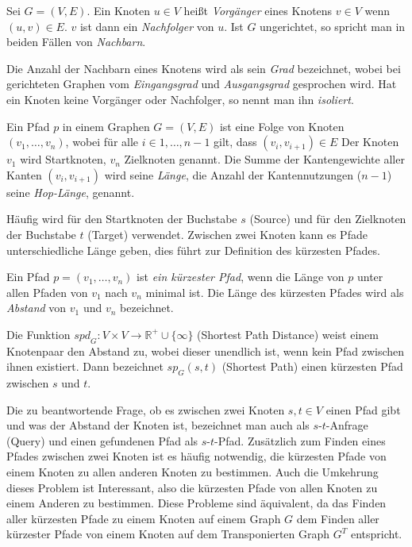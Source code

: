 \begin{definition}[Nachbar]
  Sei $G = (V, E)$. Ein Knoten $u \in V$ heißt \emph{Vorgänger} eines Knotens $v \in V$ wenn $(u, v) \in E$. $v$ ist dann ein \emph{Nachfolger} von $u$.
  Ist $G$ ungerichtet, so spricht man in beiden Fällen von \emph{Nachbarn}.
\end{definition}

Die Anzahl der Nachbarn eines Knotens wird als sein \emph{Grad} bezeichnet, wobei bei gerichteten Graphen vom \emph{Eingangsgrad} und \emph{Ausgangsgrad} gesprochen wird.
Hat ein Knoten keine Vorgänger oder Nachfolger, so nennt man ihn \emph{isoliert}.

\begin{definition}[Pfad]
  Ein Pfad $p$ in einem Graphen $G = (V, E)$ ist eine Folge von Knoten $(v_1, \dotsc, v_n)$, wobei für alle $i \in {1, \dotsc, n-1}$ gilt, dass $(v_i, v_{i+1}) \in E$
  Der Knoten $v_1$ wird Startknoten, $v_n$ Zielknoten genannt.
  Die Summe der Kantengewichte aller Kanten $(v_i, v_{i + 1})$ wird seine \emph{Länge}, die Anzahl der Kantennutzungen ($n - 1$) seine \emph{Hop-Länge}, genannt.
\end{definition}

Häufig wird für den Startknoten der Buchstabe $s$ (Source) und für den Zielknoten der Buchstabe $t$ (Target) verwendet.
Zwischen zwei Knoten kann es Pfade unterschiedliche Länge geben, dies führt zur Definition des kürzesten Pfades.

\begin{definition}
  Ein Pfad $p = (v_1 , \dotsc , v_n)$ ist \emph{ein kürzester Pfad}, wenn die Länge von $p$ unter allen Pfaden von $v_1$ nach $v_n$ minimal ist.
  Die Länge des kürzesten Pfades wird als \emph{Abstand} von $v_1$ und $v_n$ bezeichnet.

  Die Funktion ${spd}_G \colon V \times V \to \mathbb{R}^+ \cup \{ \infty \} $ (Shortest Path Distance) weist einem Knotenpaar den Abstand zu, wobei dieser unendlich ist, wenn kein Pfad zwischen ihnen existiert.
  Dann bezeichnet ${sp}_{G} (s, t)$ (Shortest Path) einen kürzesten Pfad zwischen $s$ und $t$.
\end{definition}

Die zu beantwortende Frage, ob es zwischen zwei Knoten $s, t \in V$ einen Pfad gibt und was der Abstand der Knoten ist, bezeichnet man auch als $s$-$t$-Anfrage (Query) und einen gefundenen Pfad als $s$-$t$-Pfad.
Zusätzlich zum Finden eines Pfades zwischen zwei Knoten ist es häufig notwendig, die kürzesten Pfade von einem Knoten zu allen anderen Knoten zu bestimmen.
Auch die Umkehrung dieses Problem ist Interessant, also die kürzesten Pfade von allen Knoten zu einem Anderen zu bestimmen.
Diese Probleme sind äquivalent, da das Finden aller kürzesten Pfade zu einem Knoten auf einem Graph $G$ dem Finden aller kürzester Pfade von einem Knoten auf dem Transponierten Graph $G^T$ entspricht.

